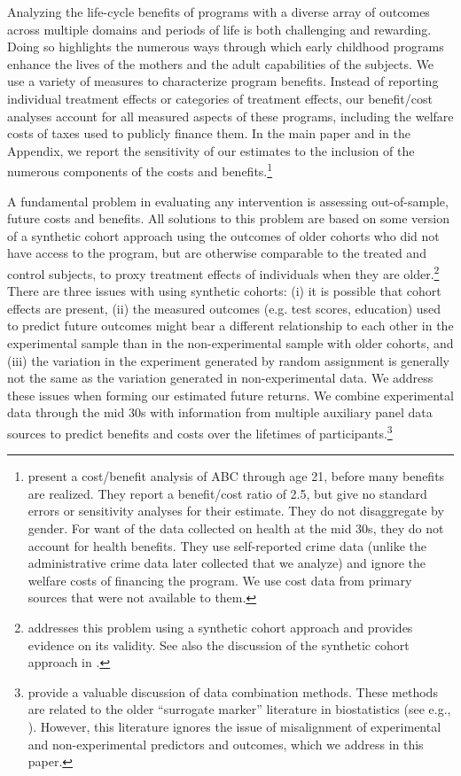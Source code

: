 Analyzing the life-cycle benefits of programs with a diverse array of outcomes across multiple domains and periods of life is both challenging and rewarding. Doing so highlights the numerous ways through which early childhood programs enhance the lives of the mothers and the adult capabilities of the subjects. We use a variety of measures to characterize program benefits. Instead of reporting individual treatment effects or categories of treatment effects, our benefit/cost analyses account for all measured aspects of these programs, including the welfare costs of taxes used to publicly finance them. In the main paper and in the Appendix, we report the sensitivity of our estimates to the inclusion of the numerous components of the costs and benefits.\footnote{\cite{Barnett_Masse_2002_benefitcost,Barnett_Masse_2007_EER} present a cost/benefit analysis of ABC through age 21, before many benefits are realized. They report a benefit/cost ratio of 2.5, but give no standard errors or sensitivity analyses for their estimate. They do not disaggregate by gender. For want of the data collected on health at the mid 30s, they do not account for health benefits. They use self-reported crime data (unlike the administrative crime data later collected that we analyze) and ignore the welfare costs of financing the program. We use cost data from primary sources that were not available to them.}

A fundamental problem in evaluating any intervention is assessing out-of-sample, future costs and benefits. All solutions to this problem are based on some version of a synthetic cohort approach using the outcomes of older cohorts who did not have access to the program, but are otherwise comparable to the treated and control subjects, to proxy treatment effects of individuals when they are older.\footnote{\cite{Mincer_1974_schooling} addresses this problem using a synthetic cohort approach and provides evidence on its validity. See also the discussion of the synthetic cohort approach in \cite{Heckman_Lochner_ea_2006_HEE}.} There are three issues with using synthetic cohorts: (i) it is possible that cohort effects are present, (ii) the measured outcomes (e.g. test scores, education) used to predict future outcomes might bear a different relationship to each other in the experimental sample than in the non-experimental sample with older cohorts, and (iii) the variation in the experiment generated by random assignment is generally not the same as the variation generated in non-experimental data. We address these issues when forming our estimated future returns. We combine experimental data through the mid 30s with information from multiple auxiliary panel data sources to predict benefits and costs over the lifetimes of participants.\footnote{\citet{Ridder_Moffitt_2007_hbk_metricsdata} provide a valuable discussion of data combination methods. These methods are related to the older ``surrogate marker'' literature in biostatistics (see e.g., \citealp{Prentice_1989_Surrogate_SiM}). However, this literature ignores the issue of misalignment of experimental and non-experimental predictors and outcomes, which we address in this paper.}

